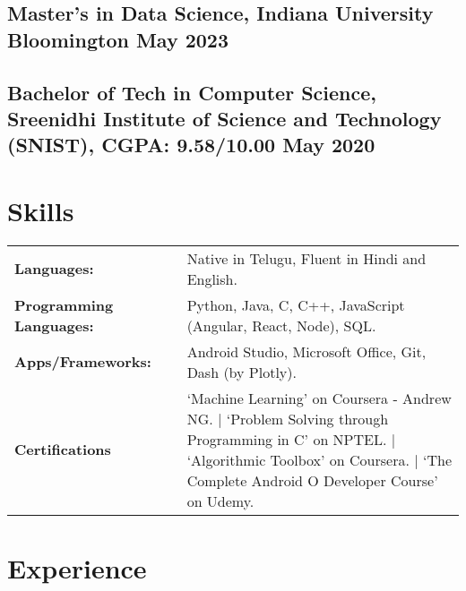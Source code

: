 \documentclass[a4,10pt]{article}
\newcommand{\hskills}[1]{
\textbf{\bfseries #1} }
\begin{document}
\subsection*{Master’s in Data Science, {\normalsize \normalfont Indiana University Bloomington} \hfill May 2023} 
\vspace{0.1cm}
\subsection*{Bachelor of Tech in Computer Science, {\normalsize \normalfont Sreenidhi Institute of Science and Technology (SNIST), CGPA: 9.58/10.00} \hfill May 2020} 
\vspace{0.2cm}



\section{Skills}
\begin{tabular}{p{11em} p{1em} p{43em}}
\hskills{Languages:} &  & Native in Telugu, Fluent in Hindi and English. \\
\hskills{Programming Languages:}&  &  Python, Java, C, C++, JavaScript (Angular, React, Node), SQL.  \\
\hskills{Apps/Frameworks:} &  & Android Studio, Microsoft Office, Git, Dash (by Plotly).   \\
\hskills{Certifications} &  & ‘Machine Learning’ on Coursera - Andrew NG. | ‘Problem Solving through Programming in C’ on NPTEL. | ‘Algorithmic Toolbox’ on Coursera. | ‘The Complete Android O Developer Course’ on Udemy. \\
\end{tabular}
\vspace{-0.2cm}




\section{Experience}
\end{document}
